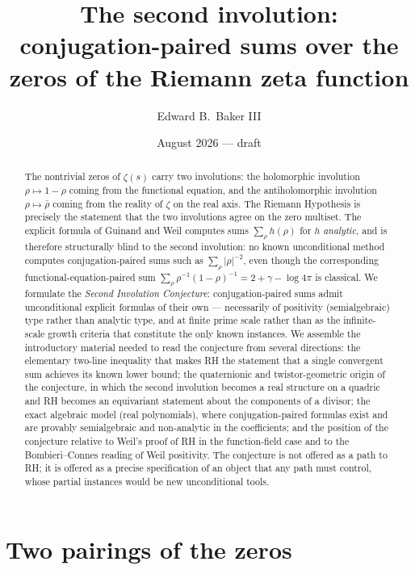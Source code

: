\documentclass[11pt]{amsart}
\title[The second involution]{The second involution:\\ conjugation-paired sums over the zeros of the Riemann zeta function}
\author{Edward B.\ Baker III}
\date{August 2026 --- draft}
\theoremstyle{definition}
\theoremstyle{remark}
\begin{document}
\begin{abstract}
The nontrivial zeros of $\zeta(s)$ carry two involutions: the holomorphic involution $\rho\mapsto 1-\rho$ coming from the functional equation, and the antiholomorphic involution $\rho\mapsto\bar\rho$ coming from the reality of $\zeta$ on the real axis. The Riemann Hypothesis is precisely the statement that the two involutions agree on the zero multiset. The explicit formula of Guinand and Weil computes sums $\sum_\rho h(\rho)$ for $h$ \emph{analytic}, and is therefore structurally blind to the second involution: no known unconditional method computes conjugation-paired sums such as $\sum_\rho |\rho|^{-2}$, even though the corresponding functional-equation-paired sum $\sum_\rho \rho^{-1}(1-\rho)^{-1} = 2+\gamma-\log 4\pi$ is classical. We formulate the \emph{Second Involution Conjecture}: conjugation-paired sums admit unconditional explicit formulas of their own --- necessarily of positivity (semialgebraic) type rather than analytic type, and at finite prime scale rather than as the infinite-scale growth criteria that constitute the only known instances. We assemble the introductory material needed to read the conjecture from several directions: the elementary two-line inequality that makes RH the statement that a single convergent sum achieves its known lower bound; the quaternionic and twistor-geometric origin of the conjecture, in which the second involution becomes a real structure on a quadric and RH becomes an equivariant statement about the components of a divisor; the exact algebraic model (real polynomials), where conjugation-paired formulas exist and are provably semialgebraic and non-analytic in the coefficients; and the position of the conjecture relative to Weil's proof of RH in the function-field case and to the Bombieri--Connes reading of Weil positivity. The conjecture is not offered as a path to RH; it is offered as a precise specification of an object that any path must control, whose partial instances would be new unconditional tools.
\end{abstract}

\maketitle
\setcounter{tocdepth}{1}
\tableofcontents

\section{Two pairings of the zeros}\label{sec:two}
\end{document}
